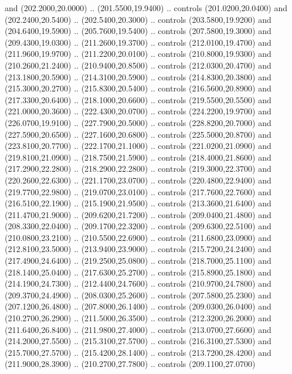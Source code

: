 {\begin{scope}[y=0.80pt, x=0.80pt, yscale=-1, xscale=1, inner sep=0pt, outer sep=0pt, #1]
      and (202.2000,20.0000) .. (201.5500,19.9400) .. controls (201.0200,20.0400)
      and (202.2400,20.5400) .. (202.5400,20.3000) .. controls (203.5800,19.9200)
      and (204.6400,19.5900) .. (205.7600,19.5400) .. controls (207.5800,19.3000)
      and (209.4300,19.0300) .. (211.2600,19.3700) .. controls (212.0100,19.4700)
      and (211.9600,19.9700) .. (211.2200,20.0100) .. controls (210.8000,19.9300)
      and (210.2600,21.2400) .. (210.9400,20.8500) .. controls (212.0300,20.4700)
      and (213.1800,20.5900) .. (214.3100,20.5900) .. controls (214.8300,20.3800)
      and (215.3000,20.2700) .. (215.8300,20.5400) .. controls (216.5600,20.8900)
      and (217.3300,20.6400) .. (218.1000,20.6600) .. controls (219.5500,20.5500)
      and (221.0000,20.3600) .. (222.4300,20.0700) .. controls (224.2200,19.9700)
      and (226.0700,19.9100) .. (227.7900,20.5000) .. controls (228.8200,20.7000)
      and (227.5900,20.6500) .. (227.1600,20.6800) .. controls (225.5000,20.8700)
      and (223.8100,20.7700) .. (222.1700,21.1000) .. controls (221.0200,21.0900)
      and (219.8100,21.0900) .. (218.7500,21.5900) .. controls (218.4000,21.8600)
      and (217.2900,22.2800) .. (218.2900,22.2800) .. controls (219.3000,22.3700)
      and (220.2600,22.6300) .. (221.1700,23.0700) .. controls (220.4800,22.9400)
      and (219.7700,22.9800) .. (219.0700,23.0100) .. controls (217.7600,22.7600)
      and (216.5100,22.1900) .. (215.1900,21.9500) .. controls (213.3600,21.6400)
      and (211.4700,21.9000) .. (209.6200,21.7200) .. controls (209.0400,21.4800)
      and (208.3300,22.0400) .. (209.1700,22.3200) .. controls (209.6300,22.5100)
      and (210.0800,23.2100) .. (210.5500,22.6900) .. controls (211.6800,23.0900)
      and (212.8100,23.5000) .. (213.9400,23.9000) .. controls (215.7200,24.2400)
      and (217.4900,24.6400) .. (219.2500,25.0800) .. controls (218.7000,25.1100)
      and (218.1400,25.0400) .. (217.6300,25.2700) .. controls (215.8900,25.1800)
      and (214.1900,24.7300) .. (212.4400,24.7600) .. controls (210.9700,24.7800)
      and (209.3700,24.4900) .. (208.0300,25.2600) .. controls (207.5800,25.2300)
      and (207.1200,26.4800) .. (207.8000,26.1400) .. controls (209.0300,26.0400)
      and (210.2700,26.2900) .. (211.5000,26.3500) .. controls (212.3200,26.2000)
      and (211.6400,26.8400) .. (211.9800,27.4000) .. controls (213.0700,27.6600)
      and (214.2000,27.5500) .. (215.3100,27.5700) .. controls (216.3100,27.5300)
      and (215.7000,27.5700) .. (215.4200,28.1400) .. controls (213.7200,28.4200)
      and (211.9000,28.3900) .. (210.2700,27.7800) .. controls (209.1100,27.0700)

\end{scope}}
